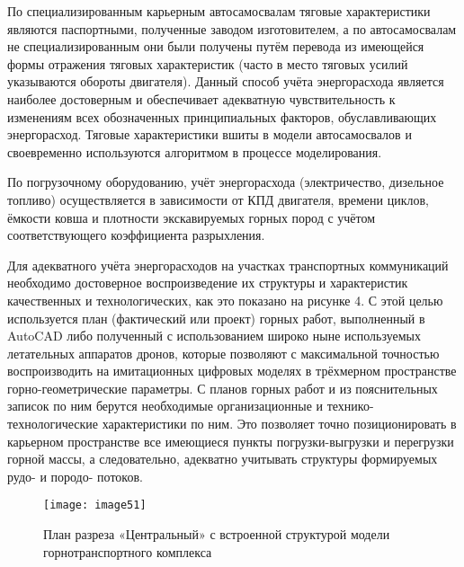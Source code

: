\begin{multicols}{2}
По специализированным карьерным автосамосвалам тяговые характеристики
являются паспортными, полученные заводом изготовителем, а по
автосамосвалам не специализированным они были получены путём перевода из
имеющейся формы отражения тяговых характеристик (часто в место тяговых
усилий указываются обороты двигателя). Данный способ учёта энергорасхода
является наиболее достоверным и обеспечивает адекватную чувствительность
к изменениям всех обозначенных принципиальных факторов, обуславливающих
энергорасход. Тяговые характеристики вшиты в модели автосамосвалов и
своевременно используются алгоритмом в процессе моделирования.

По погрузочному оборудованию, учёт энергорасхода (электричество,
дизельное топливо) осуществляется в зависимости от КПД двигателя,
времени циклов, ёмкости ковша и плотности экскавируемых горных пород с
учётом соответствующего коэффициента разрыхления.

Для адекватного учёта энергорасходов на участках транспортных
коммуникаций необходимо достоверное воспроизведение их структуры и
характеристик качественных и технологических, как это показано на
рисунке 4. С этой целью используется план (фактический или проект)
горных работ, выполненный в AutoCAD либо полученный с использованием
широко ныне используемых летательных аппаратов дронов, которые позволяют
с максимальной точностью воспроизводить на имитационных цифровых моделях
в трёхмерном пространстве горно-геометрические параметры. С планов
горных работ и из пояснительных записок по ним берутся необходимые
организационные и технико-технологические характеристики по ним. Это
позволяет точно позиционировать в карьерном пространстве все имеющиеся
пункты погрузки-выгрузки и перегрузки горной массы, а следовательно,
адекватно учитывать структуры формируемых рудо- и породо- потоков.
\end{multicols}

\begin{figure}[H]
    \centering
    \texttt{[image: image51]}
    \caption{План разреза «Центральный» с встроенной структурой модели горнотранспортного комплекса}
\end{figure}

